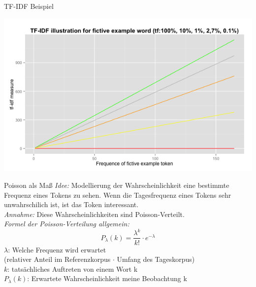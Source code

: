 \documentclass{beamer}
\begin{document}
\begin{frame}{TF-IDF Beispiel}
	\hspace{1cm}
	  \begin{centering}
	  \includegraphics[width=1\textwidth]{pictures/tfidfIllustration.png}
	\end{centering}
\end{frame}


\begin{frame}{Poisson als Ma\ss}
	\emph{Idee: } Modellierung der Wahrscheinlichkeit eine bestimmte Frequenz eines Tokens zu sehen. Wenn die Tagesfrequenz eines Tokens sehr unwahrschilich ist, ist das Token interessant.\\
	\emph{Annahme: } Diese Wahrscheinlichkeiten sind Poisson-Verteilt.\\
	\emph{Formel der Poisson-Verteilung allgemein: }
	\begin{equation}
	P_\lambda(k) = \frac{\lambda^{k}}{k!}  \cdot e^{-\lambda}
	\end{equation}
	$\lambda$: Welche Frequenz wird erwartet \\
	(relativer Anteil im Referenzkorpus $\cdot$ Umfang des Tageskorpus)\\
	$k$: tats\"achliches Auftreten von einem Wort k\\
	$P_\lambda(k)$: Erwartete Wahrscheinlichkeit meine Beobachtung k
\end{frame}
\end{document}
